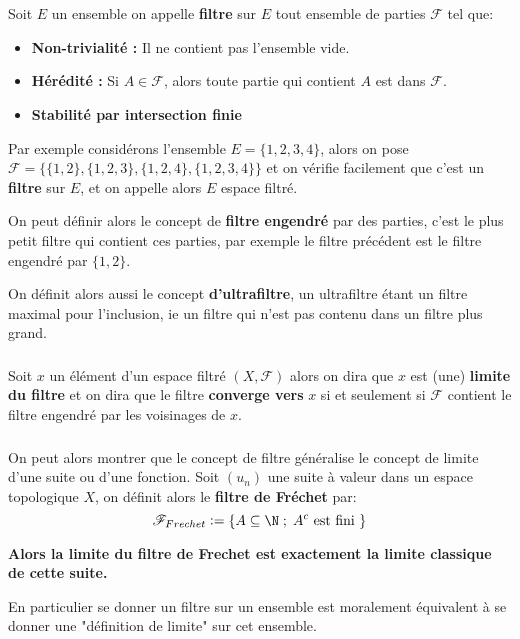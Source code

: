 \documentclass{report}
\begin{document}
\chapter*{}
\subsection*{}
Soit \(E\) un ensemble on appelle \textbf{filtre} sur \(E\) tout ensemble de parties \(\mathscr{F}\) tel que:
\begin{itemize}
   \item \textbf{Non-trivialité :} Il ne contient pas l'ensemble vide.
   \item \textbf{Hérédité :} Si \(A \in \mathscr{F}\), alors toute partie qui contient \(A\) est dans \(\mathscr{F}\).
   \item \textbf{Stabilité par intersection finie}
\end{itemize}
Par exemple considérons l'ensemble \(E = \{ 1, 2, 3, 4\}\), alors on pose \(\mathscr{F} = \{\{1, 2\}, \{1, 2, 3\}, \{1, 2, 4\}, \{1, 2, 3, 4\}\}\) et on vérifie facilement que c'est un \textbf{filtre} sur \(E\), et on appelle alors \(E\) espace filtré.\<

On peut définir alors le concept de \textbf{filtre engendré} par des parties, c'est le plus petit filtre qui contient ces parties, par exemple le filtre précédent est le filtre engendré par \(\{1, 2\}\).\<

On définit alors aussi le concept \textbf{d'ultrafiltre}, un ultrafiltre étant un filtre maximal pour l'inclusion, ie un filtre qui n'est pas contenu dans un filtre plus grand.

\subsection*{}
Soit \(x\) un élément d'un espace filtré \((X, \mathscr{F})\) alors on dira que \(x\) est (une) \textbf{limite du filtre} et on dira que le filtre \textbf{converge vers} \(x\) si et seulement si \(\mathscr{F}\) contient le filtre engendré par les voisinages de \(x\).

\subsection*{}
On peut alors montrer que le concept de filtre généralise le concept de limite d'une suite ou d'une fonction. Soit \((u_n)\) une suite à valeur dans un espace topologique \(X\), on définit alors le \textbf{filtre de Fréchet} par:
\[
   \mathscr{F}_{Frechet} := \{ A \subseteq \N \; ; \; A^c \text{ est fini }\}
\]
\begin{center}
   \textbf{Alors la limite du filtre de Frechet est exactement la limite classique de cette suite.}
\end{center}
En particulier se donner un filtre sur un ensemble est moralement équivalent à se donner une "définition de limite" sur cet ensemble.
\end{document}
